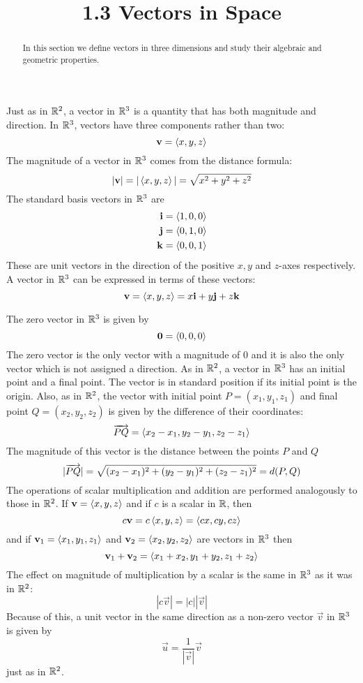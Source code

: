 \documentclass[handout]{ximera}
\title{1.3 Vectors in Space}
\begin{document}
\begin{abstract}
In this section we define vectors in three dimensions and study their algebraic and geometric properties.
\end{abstract}
 
\maketitle

Just as in $\mathbb R^2$, a vector in $\mathbb R^3$ is a quantity that has both magnitude and direction.
In $\mathbb R^3$, vectors have three components rather than two:
\[
\mathbf{v} = \left\langle x, y, z\right\rangle
\]
The magnitude of a vector in $\mathbb R^3$ comes from the distance formula:
\[
|\mathbf{v}| = |\left\langle x, y, z\right\rangle| = \sqrt{x^2 + y^2 + z^2}
\]
The standard basis vectors in $\mathbb R^3$ are
\begin{align*}
\mathbf{i} &= \left\langle 1, 0, 0\right\rangle\\
\mathbf{j} &= \left\langle 0, 1, 0\right\rangle\\
\mathbf{k} &= \left\langle 0, 0, 1\right\rangle\\
\end{align*}
These are unit vectors in the direction of the positive $x, y$ and $z$-axes respectively.
A vector in $\mathbb R^3$ can be expressed in terms of these vectors:
\[
\mathbf{v} = \left\langle x, y, z\right\rangle = x\mathbf{i} + y\mathbf{j} + z\mathbf{k}
\]

The zero vector in $\mathbb R^3$ is given by
\[
\mathbf{0} = \left\langle 0,0,0\right\rangle
\]
The zero vector is the only vector with a magnitude of $0$ and it is also the only vector which is not assigned a direction.
As in $\mathbb R^2$, a vector in $\mathbb R^3$ has an initial point and a final point.  The vector is in standard position if its initial point is the origin.
Also, as in $\mathbb R^2$, the vector with initial point $P = (x_1, y_1, z_1)$ and final point $Q = (x_2, y_2, z_2)$ is given by the difference of their coordinates:
\[
\arrowvec{PQ} = \vector{x_2 - x_1, y_2-y_1, z_2-z_1} %
\]
The magnitude of this vector is the distance between the points $P$ and $Q$
\[
|\arrowvec{PQ}| = \sqrt{(x_2-x_1)^2 + (y_2-y_1)^2 +(z_2-z_1)^2} = d(P, Q) %
\]
The operations of scalar multiplication and addition are performed analogously to those in $\mathbb R^2$.
If $\mathbf{v} = \left\langle x, y, z\right\rangle$ and if $c$ is a scalar in $\mathbb R$, then
\[
c\mathbf{v} = c\left\langle x, y, z\right\rangle = \left\langle cx, cy, cz\right\rangle
\]
and if $\mathbf{v}_1 = \left\langle x_1, y_1, z_1\right\rangle$ and $\mathbf{v}_2 = \left\langle x_2, y_2, z_2\right\rangle$ are vectors in $\mathbb R^3$ then
\[
\mathbf{v}_1 + \mathbf{v}_2 = \left\langle x_1+x_2, y_1+y_2, z_1+z_2\right\rangle
\]
The effect on magnitude of multiplication by a scalar is the same in $\mathbb R^3$ as it was in $\mathbb R^2$:
\[
|c\vec{v}| = |c| |\vec{v}|
\]
Because of this, a unit vector in the same direction as a non-zero vector $\vec{v}$ in $\mathbb R^3$ is given by
\[
\vec{u} = \frac{1}{|\vec{v}|} \vec{v}
\]
just as in $\mathbb R^2$.
\end{document}
